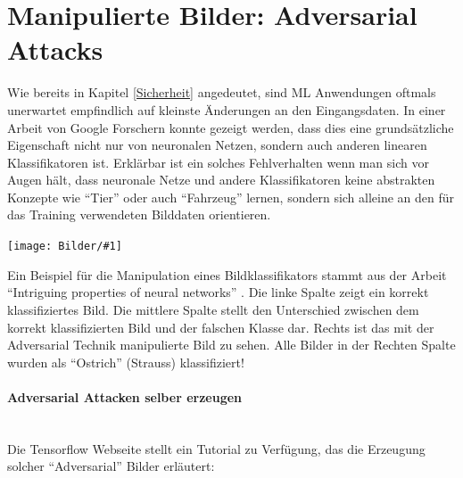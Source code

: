 \documentclass[
  12pt, %
  a4paper, %
  oneside, %
  openany, 
  numbers=noenddot, %
  BCOR=5mm, %
  parskip=half*, %
  thesis, %
]{bfhbook}
\newcommand{\parag}[1]{\paragraph*{#1}\mbox{}\\}
\newcommand{\imgText}[3]{
\begin{center}
    \begin{minipage}[t]{0.6\textwidth}
    		\vspace{0pt}
		\texttt{[image: Bilder/\#1]}
		\captionof{figure}{#2}
	\end{minipage}\hfill
    \begin{minipage}[t]{0.4\textwidth}
    		\vspace{5pt}
  		#3
    \end{minipage}
\end{center}
}
\begin{document}
\section{Manipulierte Bilder: Adversarial Attacks}
\label{Adversarial Attacks}
Wie bereits in Kapitel \ref{Sicherheit} angedeutet, sind \Gls{ML} Anwendungen oftmals unerwartet empfindlich auf kleinste Änderungen an den Eingangsdaten. In einer Arbeit von Google Forschern   \parencite{Goodfellow2014} konnte gezeigt werden, dass dies eine grundsätzliche Eigenschaft nicht nur von neuronalen Netzen, sondern auch anderen linearen Klassifikatoren ist. Erklärbar ist ein solches Fehlverhalten wenn man sich vor Augen hält, dass neuronale Netze und andere Klassifikatoren keine abstrakten Konzepte wie ``Tier'' oder auch ``Fahrzeug'' lernen, sondern sich alleine an den für das Training verwendeten Bilddaten orientieren.

\imgText{adversarial.png}{Adversarial Beispiel \protect\footnotemark{}}{
Ein Beispiel für die Manipulation eines Bildklassifikators stammt aus der Arbeit ``Intriguing properties of neural networks'' \parencite{Szegedy2013}. 
\break\break
Die linke Spalte zeigt ein korrekt klassifiziertes Bild.
\break\break
Die mittlere Spalte stellt den Unterschied zwischen dem korrekt klassifizierten Bild und der falschen Klasse dar.
\break\break
Rechts ist das mit der Adversarial Technik manipulierte Bild zu sehen.
\break\break
Alle Bilder in der Rechten Spalte wurden als ``Ostrich'' (Strauss) klassifiziert!
}

\parag{Adversarial Attacken selber erzeugen}
Die Tensorflow Webseite stellt ein Tutorial zu Verfügung, das die Erzeugung solcher ``Adversarial'' Bilder erläutert: \parencite{tensorflowFGSM}
\end{document}
